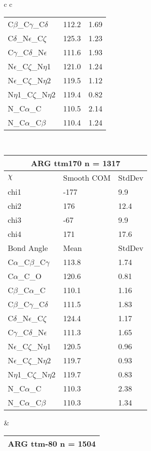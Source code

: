 \begin{longtable}{ c c }
\begin{tabular}{ l l l }
  C$\beta$\_C$\gamma$\_C$\delta$ & 112.2 & 1.69\\
  C$\delta$\_N$\epsilon$\_C$\zeta$ & 125.3 & 1.23\\
  C$\gamma$\_C$\delta$\_N$\epsilon$ & 111.6 & 1.93\\
  N$\epsilon$\_C$\zeta$\_N$\eta$1 & 121.0 & 1.24\\
  N$\epsilon$\_C$\zeta$\_N$\eta$2 & 119.5 & 1.12\\
  N$\eta$1\_C$\zeta$\_N$\eta$2 & 119.4 & 0.82\\
  N\_C$\alpha$\_C & 110.5 & 2.14\\
  N\_C$\alpha$\_C$\beta$ & 110.4 & 1.24\\
  \bottomrule
  \end{tabular}
  \\
  \begin{tabular}{ l l l }
  \toprule
  \multicolumn{3}{c}{ARG \textbf{ttm170} n = 1317} \\ \toprule
  $\chi$       & Smooth COM & StdDev \\ \midrule
  chi1 & -177 & 9.9 \\ 
  chi2 & 176 & 12.4 \\ 
  chi3 & -67 & 9.9 \\ 
  chi4 & 171 & 17.6 \\ \midrule
  Bond Angle   & Mean     & StdDev \\ \midrule
  C$\alpha$\_C$\beta$\_C$\gamma$ & 113.8 & 1.74\\
  C$\alpha$\_C\_O & 120.6 & 0.81\\
  C$\beta$\_C$\alpha$\_C & 110.1 & 1.16\\
  C$\beta$\_C$\gamma$\_C$\delta$ & 111.5 & 1.83\\
  C$\delta$\_N$\epsilon$\_C$\zeta$ & 124.4 & 1.17\\
  C$\gamma$\_C$\delta$\_N$\epsilon$ & 111.3 & 1.65\\
  N$\epsilon$\_C$\zeta$\_N$\eta$1 & 120.5 & 0.96\\
  N$\epsilon$\_C$\zeta$\_N$\eta$2 & 119.7 & 0.93\\
  N$\eta$1\_C$\zeta$\_N$\eta$2 & 119.7 & 0.83\\
  N\_C$\alpha$\_C & 110.3 & 2.38\\
  N\_C$\alpha$\_C$\beta$ & 110.3 & 1.34\\
  \bottomrule
  \end{tabular}
  &
  \begin{tabular}{ l l l }
  \toprule
  \multicolumn{3}{c}{ARG \textbf{ttm-80} n = 1504} \\ \toprule

\end{tabular}
\end{longtable}
